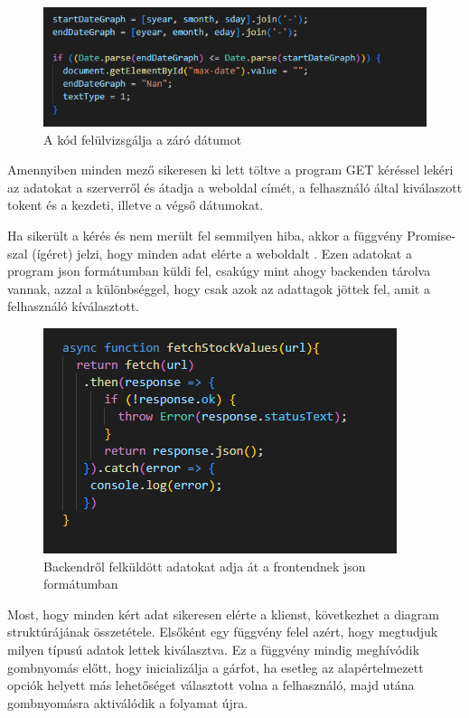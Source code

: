 \begin{figure}[h]
\centering
\includegraphics[scale=0.9]{images/emptyDate.png}
\caption{A kód felülvizsgálja a záró dátumot}
\end{figure}

Amennyiben minden mező sikeresen ki lett töltve a program GET kéréssel lekéri az adatokat a szerverről és átadja a weboldal címét, a felhasználó által kiválaszott tokent és a kezdeti, illetve a végső dátumokat. 


Ha sikerült a kérés és nem merült fel semmilyen hiba, akkor a függvény Promise-szal (ígéret) jelzi, hogy minden adat elérte a weboldalt . Ezen adatokat a program json formátumban küldi fel, csakúgy mint ahogy backenden tárolva vannak, azzal a különbséggel, hogy csak azok az adattagok jöttek fel, amit a felhasználó kíválasztott.

\begin{figure}[h]
\centering
\includegraphics[scale=0.8]{images/fetch.png}
\caption{Backendről felküldött adatokat adja át a frontendnek json formátumban}
\label{fig:fetch}
\end{figure}

Most, hogy minden kért adat sikeresen elérte a klienst, következhet a diagram struktúrájának összetétele. Elsőként egy függvény felel azért, hogy megtudjuk milyen típusú adatok lettek kiválasztva. Ez a függvény mindig meghívódik gombnyomás előtt, hogy inicializálja a gárfot, ha esetleg az alapértelmezett opciók helyett más lehetőséget választott volna a felhasználó, majd utána gombnyomásra aktiválódik a folyamat újra.

